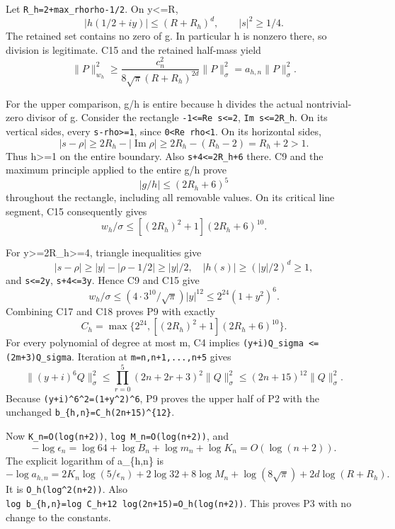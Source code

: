 \documentclass[11pt]{article}
\begin{document}
Let \texttt{R\_h=2+max\_rho\textbar{}rho-1/2\textbar{}}. On \textbar y\textbar\textless=R, \[
|h(1/2+iy)|\le(R+R_h)^d,\qquad |s|^2\ge1/4.
\] The retained set contains no zero of g. In particular h is nonzero there, so division is legitimate. C15 and the retained half-mass yield \[
\|P\|_{w_h}^2\ge
\frac{c_n^2}{8\sqrt\pi(R+R_h)^{2d}}\|P\|_\sigma^2
=a_{h,n}\|P\|_\sigma^2.
\tag{C16}
\]

For the upper comparison, g/h is entire because h divides the actual nontrivial-zero divisor of g. Consider the rectangle \texttt{-1\textless{}=Re\ s\textless{}=2}, \texttt{\textbar{}Im\ s\textbar{}\textless{}=2R\_h}. On its vertical sides, every \texttt{\textbar{}s-rho\textbar{}\textgreater{}=1}, since \texttt{0\textless{}Re\ rho\textless{}1}. On its horizontal sides, \[
|s-\rho|\ge2R_h-|\operatorname{Im}\rho|
 \ge2R_h-(R_h-2)=R_h+2>1.
\] Thus \textbar h\textbar\textgreater=1 on the entire boundary. Also \texttt{\textbar{}s\textbar{}+4\textless{}=2R\_h+6} there. C9 and the maximum principle applied to the entire g/h prove \[
|g/h|\le(2R_h+6)^5
\] throughout the rectangle, including all removable values. On its critical line segment, C15 consequently gives \[
w_h/\sigma\le[(2R_h)^2+1](2R_h+6)^{10}.
\tag{C17}
\]

For \textbar y\textbar\textgreater=2R\_h\textgreater=4, triangle inequalities give \[
|s-\rho|\ge|y|-|\rho-1/2|\ge|y|/2,\quad
|h(s)|\ge(|y|/2)^d\ge1,
\] and \texttt{\textbar{}s\textbar{}\textless{}=2\textbar{}y\textbar{}}, \texttt{\textbar{}s\textbar{}+4\textless{}=3\textbar{}y\textbar{}}. Hence C9 and C15 give \[
w_h/\sigma\le(4\cdot3^{10}/\sqrt\pi)|y|^{12}
 \le2^{24}(1+y^2)^6.
\tag{C18}
\] Combining C17 and C18 proves P9 with exactly \[
C_h=\max\{2^{24},[(2R_h)^2+1](2R_h+6)^{10}\}.
\] For every polynomial of degree at most m, C4 implies \texttt{\textbar{}\textbar{}(y+i)Q\textbar{}\textbar{}\_sigma\ \textless{}=(2m+3)\textbar{}\textbar{}Q\textbar{}\textbar{}\_sigma}. Iteration at \texttt{m=n,n+1,...,n+5} gives \[
\|(y+i)^6Q\|_\sigma^2\le
 \prod_{r=0}^5(2n+2r+3)^2\|Q\|_\sigma^2
 \le(2n+15)^{12}\|Q\|_\sigma^2.
\] Because \texttt{\textbar{}(y+i)\^{}6\textbar{}\^{}2=(1+y\^{}2)\^{}6}, P9 proves the upper half of P2 with the unchanged \texttt{b\_\{h,n\}=C\_h(2n+15)\^{}\{12\}}.

Now \texttt{K\_n=O(log(n+2))}, \texttt{log\ M\_n=O(log(n+2))}, and \[
-\log\epsilon_n=
\log64+\log B_n+\log m_n+\log K_n=O(\log(n+2)).
\] The explicit logarithm of a\_\{h,n\} is \[
-\log a_{h,n}=
2K_n\log(5/\epsilon_n)+2\log32+8\log M_n
+\log(8\sqrt\pi)+2d\log(R+R_h).
\tag{C19}
\] It is \texttt{O\_h(log\^{}2(n+2))}. Also \texttt{log\ b\_\{h,n\}=log\ C\_h+12\ log(2n+15)=O\_h(log(n+2))}. This proves P3 with no change to the constants.
\end{document}
